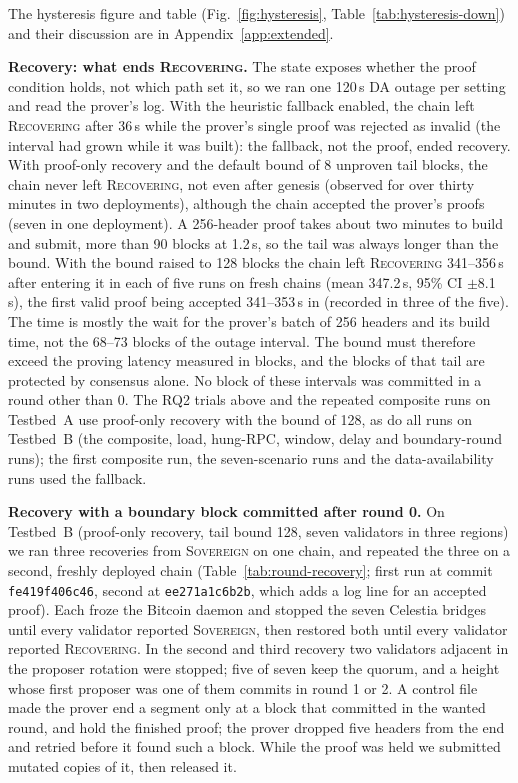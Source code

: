 The hysteresis figure and table (Fig.~\ref{fig:hysteresis}, Table~\ref{tab:hysteresis-down}) and their discussion are in Appendix~\ref{app:extended}.

\textbf{Recovery: what ends \textsc{Recovering}.} The state exposes whether the proof
condition holds, not which path set it, so we ran one 120\,s DA outage per
setting and read the prover's log. With the heuristic fallback enabled, the
chain left \textsc{Recovering} after 36\,s while the prover's single proof was
rejected as invalid (the interval had grown while it was built): the fallback,
not the proof, ended recovery. With proof-only recovery and the default bound of
8 unproven tail blocks, the chain never left \textsc{Recovering}, not even after
genesis (observed for over thirty minutes in two deployments), although the
chain accepted the prover's proofs (seven in one deployment). A 256-header proof
takes about two minutes to build and submit, more than 90 blocks at 1.2\,s, so
the tail was always longer than the bound. With the bound raised to 128 blocks
the chain left \textsc{Recovering} 341--356\,s after entering it in each of five
runs on fresh chains (mean 347.2\,s, 95\% CI $\pm$8.1\,s), the first valid proof
being accepted 341--353\,s in (recorded in three of the five). The time is
mostly the wait for the prover's batch of 256 headers and its build time, not
the 68--73 blocks of the outage interval. The bound must therefore exceed the proving
latency measured in blocks, and the blocks of that tail are protected by
consensus alone. No block of these intervals was committed in a round other than
0. The RQ2 trials above and the repeated composite runs on Testbed~A use proof-only recovery
with the bound of 128, as do all runs on Testbed~B (the composite, load, hung-RPC, window, delay and boundary-round runs); the first composite run, the seven-scenario runs and the
data-availability runs used the fallback.

\textbf{Recovery with a boundary block committed after round 0.} On Testbed~B (proof-only recovery, tail bound 128, seven validators in three regions) we ran three recoveries from \textsc{Sovereign} on one chain, and repeated the three on a second, freshly deployed chain (Table~\ref{tab:round-recovery}; first run at commit \texttt{fe419f406c46}, second at \texttt{ee271a1c6b2b}, which adds a log line for an accepted proof). Each froze the Bitcoin daemon and stopped the seven Celestia bridges until every validator reported \textsc{Sovereign}, then restored both until every validator reported \textsc{Recovering}. In the second and third recovery two validators adjacent in the proposer rotation were stopped; five of seven keep the quorum, and a height whose first proposer was one of them commits in round 1 or 2. A control file made the prover end a segment only at a block that committed in the wanted round, and hold the finished proof; the prover dropped five headers from the end and retried before it found such a block. While the proof was held we submitted mutated copies of it, then released it.

